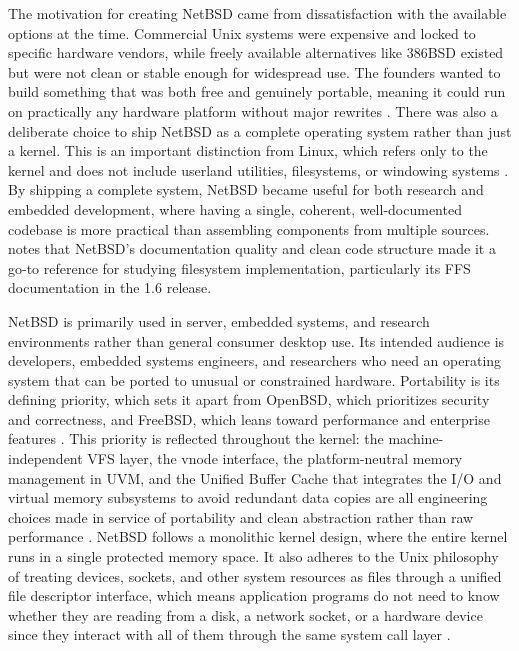 The motivation for creating NetBSD came from dissatisfaction with the available options at the time. Commercial Unix systems were expensive
and locked to specific hardware vendors, while freely available alternatives like 386BSD existed but were not clean or stable enough
for widespread use. The founders wanted to build something that was both free and genuinely portable, meaning it could run on practically
any hardware platform without major rewrites \parencite{netBSDnd}. There was also a deliberate choice to ship NetBSD as a complete
operating system rather than just a kernel. This is an important distinction from Linux, which refers only to the kernel and does not include
userland utilities, filesystems, or windowing systems \parencite{thomas_rantugi2022}. By shipping a complete system, NetBSD became useful for both
research and embedded development, where having a single, coherent, well-documented codebase is more practical than assembling components from
multiple sources. \textcite{chung2002} notes that NetBSD's documentation quality and clean code structure made it a go-to reference for studying filesystem
implementation, particularly its FFS documentation in the 1.6 release.

NetBSD is primarily used in server, embedded systems, and research environments rather than general consumer desktop use. Its intended audience is
developers, embedded systems engineers, and researchers who need an operating system that can be ported to unusual or constrained hardware. Portability
is its defining priority, which sets it apart from OpenBSD, which prioritizes security and correctness, and FreeBSD, which leans toward
performance and enterprise features \parencite{thomas_rantugi2022}. This priority is reflected throughout the kernel: the machine-independent VFS
layer, the vnode interface, the platform-neutral memory management in UVM, and the Unified Buffer Cache that integrates the I/O and virtual
memory subsystems to avoid redundant data copies are all engineering choices made in service of portability and clean abstraction rather than
raw performance \parencite{chung2002}. NetBSD follows a monolithic kernel design, where the entire kernel runs in a single protected memory space. It
also adheres to the Unix philosophy of treating devices, sockets, and other system resources as files through a unified file descriptor interface,
which means application programs do not need to know whether they are reading from a disk, a network socket, or a hardware device since they interact
with all of them through the same system call layer \parencite{chung2002}.

